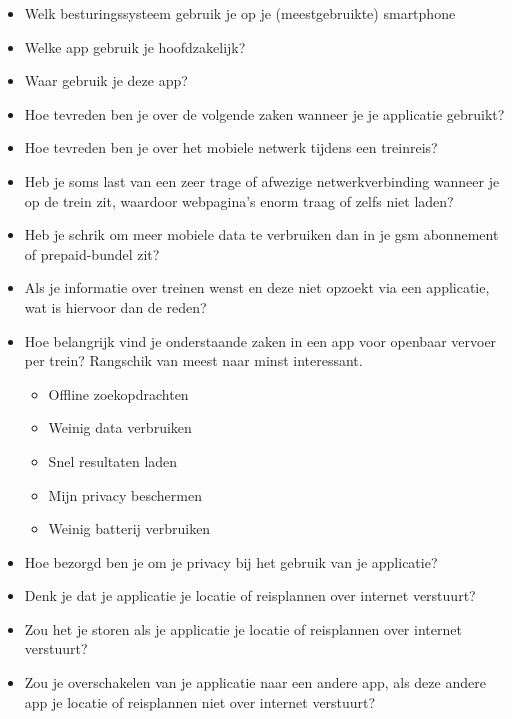 \begin{appendices}
\begin{itemize}
	\item Welk besturingssysteem gebruik je op je (meestgebruikte) smartphone
	\item Welke app gebruik je hoofdzakelijk?
	\item Waar gebruik je deze app?
	\item Hoe tevreden ben je over de volgende zaken wanneer je je applicatie gebruikt?
	\item Hoe tevreden ben je over het mobiele netwerk tijdens een treinreis?
	\item Heb je soms last van een zeer trage of afwezige netwerkverbinding wanneer je op de trein zit, waardoor webpagina's enorm traag of  zelfs niet laden?
	\item Heb je schrik om meer mobiele data te verbruiken dan in je gsm abonnement of prepaid-bundel zit?
	\item Als je informatie over treinen wenst en deze niet opzoekt via een applicatie, wat is hiervoor dan de reden?
	\item Hoe belangrijk vind je onderstaande zaken in een app voor openbaar vervoer per trein? Rangschik van meest naar minst interessant.
	\begin{itemize}
		\item Offline zoekopdrachten
		\item Weinig data verbruiken
		\item Snel resultaten laden
		\item Mijn privacy beschermen
		\item Weinig batterij verbruiken
	\end{itemize}
	
	\item Hoe bezorgd ben je om je privacy bij het gebruik van je applicatie?
	\item Denk je dat je applicatie je locatie of reisplannen over internet verstuurt?
	\item Zou het je storen als je applicatie je locatie of reisplannen over internet verstuurt?
	\item Zou je overschakelen van je applicatie naar een andere app, als deze andere app je locatie of reisplannen niet over internet verstuurt?
	

\end{itemize}
\end{appendices}
